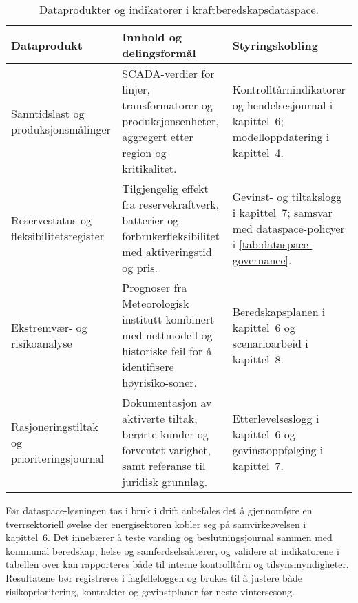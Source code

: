 \begin{table}[ht]
    \centering
    \caption{Dataprodukter og indikatorer i kraftberedskapsdataspace.}
    \label{tab:kraftberedskap-dataspace}
    \begin{tabular}{p{3.6cm}p{4.8cm}p{3.2cm}}
        \toprule
        \textbf{Dataprodukt} & \textbf{Innhold og delingsformål} & \textbf{Styringskobling} \\
        \midrule
        Sanntidslast og produksjonsmålinger & SCADA-verdier for linjer, transformatorer og produksjonsenheter, aggregert etter region og kritikalitet. & Kontrolltårnindikatorer og hendelsesjournal i kapittel~6; modelloppdatering i kapittel~4. \\
        \addlinespace
        Reservestatus og fleksibilitetsregister & Tilgjengelig effekt fra reservekraftverk, batterier og forbrukerfleksibilitet med aktiveringstid og pris. & Gevinst- og tiltakslogg i kapittel~7; samsvar med dataspace-policyer i \autoref{tab:dataspace-governance}. \\
        \addlinespace
        Ekstremvær- og risikoanalyse & Prognoser fra Meteorologisk institutt kombinert med nettmodell og historiske feil for å identifisere høyrisiko-soner. & Beredskapsplanen i kapittel~6 og scenarioarbeid i kapittel~8. \\
        \addlinespace
        Rasjoneringstiltak og prioriteringsjournal & Dokumentasjon av aktiverte tiltak, berørte kunder og forventet varighet, samt referanse til juridisk grunnlag. & Etterlevelseslogg i kapittel~6 og gevinstoppfølging i kapittel~7. \\
        \bottomrule
    \end{tabular}
\end{table}

Før dataspace-løsningen tas i bruk i drift anbefales det å gjennomføre en tverrsektoriell øvelse der energisektoren kobler seg på samvirkeøvelsen i kapittel~6. Det innebærer å teste varsling og beslutningsjournal sammen med kommunal beredskap, helse og samferdselsaktører, og validere at indikatorene i tabellen over kan rapporteres både til interne kontrolltårn og tilsynsmyndigheter. Resultatene bør registreres i fagfelleloggen og brukes til å justere både risikoprioritering, kontrakter og gevinstplaner før neste vintersesong.

